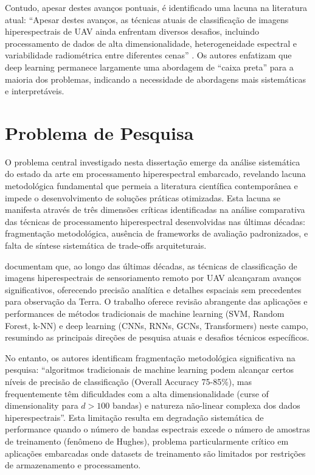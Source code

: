 Contudo, apesar destes avanços pontuais, é identificado uma lacuna 
na literatura atual: ``Apesar destes avanços, as técnicas atuais de 
classificação de imagens hiperespectrais de UAV ainda enfrentam diversos 
desafios, incluindo processamento de dados de alta dimensionalidade, 
heterogeneidade espectral e variabilidade radiométrica entre diferentes 
cenas'' 
\cite{Zhang2024}. 
Os autores enfatizam que deep learning permanece largamente uma abordagem de 
``caixa preta'' para a maioria dos problemas, indicando a necessidade de 
abordagens mais sistemáticas e interpretáveis.

\section{Problema de Pesquisa}\label{sec:problema_pesquisa}

O problema central investigado nesta dissertação emerge da análise sistemática 
do estado da arte em processamento hiperespectral embarcado, revelando lacuna 
metodológica fundamental que permeia a literatura científica contemporânea e 
impede o desenvolvimento de soluções práticas otimizadas. Esta lacuna se 
manifesta através de três dimensões críticas identificadas na análise 
comparativa das técnicas de processamento hiperespectral desenvolvidas nas 
últimas décadas: fragmentação metodológica, ausência de frameworks de 
avaliação padronizados, e falta de síntese sistemática de trade-offs 
arquiteturais.

\textcite{Zhang2024} documentam que, ao longo das últimas décadas, as 
técnicas de classificação de imagens hiperespectrais de sensoriamento remoto 
por UAV alcançaram avanços significativos, oferecendo precisão analítica 
e detalhes espaciais sem precedentes para observação da Terra. O trabalho 
oferece revisão abrangente das aplicações e performances de métodos 
tradicionais de machine learning (SVM, Random Forest, k-NN) e deep learning 
(CNNs, RNNs, GCNs, Transformers) neste campo, resumindo as principais 
direções de pesquisa atuais e desafios técnicos específicos.

No entanto, os autores identificam fragmentação metodológica significativa 
na pesquisa: ``algoritmos tradicionais de machine learning podem alcançar 
certos níveis de precisão de classificação (Overall Accuracy 75-85\%), mas 
frequentemente têm dificuldades com a alta dimensionalidade (curse of 
dimensionality para $d > 100$ bandas) e natureza não-linear complexa dos 
dados hiperespectrais''. Esta limitação resulta em degradação sistemática 
de performance quando o número de bandas espectrais excede o número de 
amostras de treinamento (fenômeno de Hughes), problema particularmente 
crítico em aplicações embarcadas onde datasets de treinamento são limitados 
por restrições de armazenamento e processamento.

